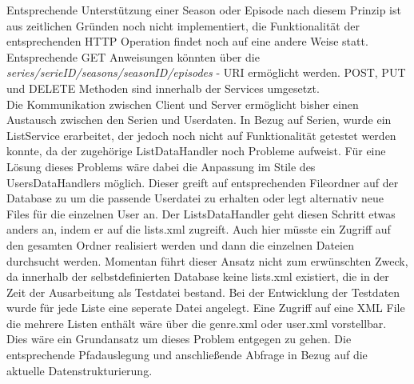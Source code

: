 \vspace{0.2cm}
Entsprechende Unterstützung einer Season oder Episode nach diesem Prinzip ist aus zeitlichen Gründen noch nicht implementiert, die Funktionalität der entsprechenden HTTP Operation findet noch auf eine andere Weise statt. Entsprechende GET Anweisungen könnten über die \textit{series/{serieID}/seasons/{seasonID}/episodes} - URI ermöglicht werden. POST, PUT und DELETE Methoden sind innerhalb der Services umgesetzt.\\
Die Kommunikation zwischen Client und Server ermöglicht bisher einen Austausch zwischen den Serien und Userdaten. In Bezug auf Serien, wurde ein ListService erarbeitet, der jedoch noch nicht auf Funktionalität getestet werden konnte, da der zugehörige ListDataHandler noch Probleme aufweist. Für eine Lösung dieses Problems wäre dabei die Anpassung im Stile des UsersDataHandlers möglich. Dieser greift auf entsprechenden Fileordner auf der Database zu um die passende Userdatei zu erhalten oder legt alternativ neue Files für die einzelnen User an. Der ListsDataHandler geht diesen Schritt etwas anders an, indem er auf die lists.xml zugreift. Auch hier müsste ein Zugriff auf den gesamten Ordner realisiert werden und dann die einzelnen Dateien durchsucht werden. Momentan führt dieser Ansatz nicht zum erwünschten Zweck, da innerhalb der selbstdefinierten Database keine lists.xml existiert, die in der Zeit der Ausarbeitung als Testdatei bestand. Bei der Entwicklung der Testdaten wurde für jede Liste eine seperate Datei angelegt. Eine Zugriff auf eine XML File die mehrere Listen enthält wäre über die genre.xml oder user.xml vorstellbar. Dies wäre ein Grundansatz um dieses Problem entgegen zu gehen. Die entsprechende Pfadauslegung und anschließende Abfrage in Bezug auf die aktuelle Datenstrukturierung.

